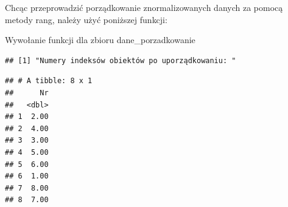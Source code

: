 \documentclass[12pt,a4paper]{report}
\begin{document}
{Chcąc przeprowadzić porządkowanie znormalizowanych danych za pomocą metody rang, należy użyć poniższej funkcji:

\begin{Shaded}
\begin{Highlighting}[]
  \NormalTok{\{}
  \NormalTok{:}
  \NormalTok{\{}
    \NormalTok{x[}\NormalTok{]=}
  \NormalTok{\}}
  \NormalTok{x[,}\NormalTok{] <-} 
  \NormalTok{:}
  \NormalTok{\{}
    \NormalTok{):(}\NormalTok{))}
    \NormalTok{\{}
      \NormalTok{x[i,}\NormalTok{(x)]=x[i,}\NormalTok{(x)]+x[i,j]}
    \NormalTok{\}}
    \NormalTok{x[i,}\NormalTok{(x)]=x[i,}\NormalTok{(x)]/(}\NormalTok{)}
  \NormalTok{\}}
  \NormalTok{x<-x[}\NormalTok{(x$zmienna_syntetyczna),]}
  \NormalTok{(}\NormalTok{)}
  \NormalTok{(x[}\NormalTok{])}
\NormalTok{\}}
\end{Highlighting}
\end{Shaded}

Wywołanie funkcji dla zbioru dane\_porzadkowanie 

\begin{Shaded}
\begin{Highlighting}[]
\end{Highlighting}
\end{Shaded}

\begin{verbatim}
## [1] "Numery indeksów obiektów po uporządkowaniu: "
\end{verbatim}

\begin{verbatim}
## # A tibble: 8 x 1
##      Nr
##   <dbl>
## 1  2.00
## 2  4.00
## 3  3.00
## 4  5.00
## 5  6.00
## 6  1.00
## 7  8.00
## 8  7.00
\end{verbatim}

}
\end{document}
